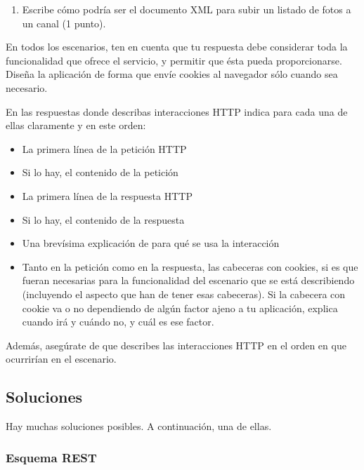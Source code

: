 {\begin{enumerate}
\item Escribe cómo podría ser el documento XML para subir un listado de fotos a un canal (1 punto).
\end{enumerate}

En todos los escenarios, ten en cuenta que tu respuesta debe considerar toda la funcionalidad que ofrece el servicio, y permitir que ésta pueda proporcionarse. Diseña la aplicación de forma que envíe cookies al navegador sólo cuando sea necesario.

En las respuestas donde describas interacciones HTTP indica para cada una de ellas claramente y en este orden:
  \begin{itemize}
  \item La primera línea de la petición HTTP
  \item Si lo hay, el contenido de la petición
  \item La primera línea de la respuesta HTTP
  \item Si lo hay, el contenido de la respuesta
  \item Una brevísima explicación de para qué se usa la interacción
  \item Tanto en la petición como en la respuesta, las cabeceras con cookies, si es que fueran necesarias para la funcionalidad del escenario que se está describiendo (incluyendo el aspecto que han de tener esas cabeceras). Si la cabecera con cookie va o no dependiendo de algún factor ajeno a tu aplicación, explica cuando irá y cuándo no, y cuál es ese factor.
  \end{itemize}

Además, asegúrate de que describes las interacciones HTTP en el orden en que ocurrirían en el escenario.


\subsection*{Soluciones}

Hay muchas soluciones posibles. A continuación, una de ellas.

\subsubsection*{Esquema REST}

}
